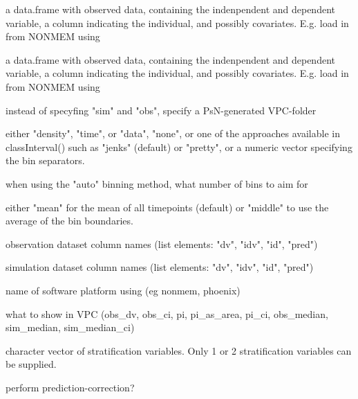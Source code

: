 \documentclass[letterpaper]{book}
\begin{document}
\begin{Arguments}
\begin{ldescription}
\item[\code{sim}] a data.frame with observed data, containing the indenpendent and dependent variable, a column indicating the individual, and possibly covariates. E.g. load in from NONMEM using 

\item[\code{obs}] a data.frame with observed data, containing the indenpendent and dependent variable, a column indicating the individual, and possibly covariates. E.g. load in from NONMEM using 

\item[\code{psn\_folder}] instead of specyfing "sim" and "obs", specify a PsN-generated VPC-folder

\item[\code{bins}] either "density", "time", or "data", "none", or one of the approaches available in classInterval() such as "jenks" (default) or "pretty", or a numeric vector specifying the bin separators.

\item[\code{n\_bins}] when using the "auto" binning method, what number of bins to aim for

\item[\code{bin\_mid}] either "mean" for the mean of all timepoints (default) or "middle" to use the average of the bin boundaries.

\item[\code{obs\_cols}] observation dataset column names (list elements: "dv", "idv", "id", "pred")

\item[\code{sim\_cols}] simulation dataset column names (list elements: "dv", "idv", "id", "pred")

\item[\code{software}] name of software platform using (eg nonmem, phoenix)

\item[\code{show}] what to show in VPC (obs\_dv, obs\_ci, pi, pi\_as\_area, pi\_ci, obs\_median, sim\_median, sim\_median\_ci)

\item[\code{stratify}] character vector of stratification variables. Only 1 or 2 stratification variables can be supplied.

\item[\code{pred\_corr}] perform prediction-correction?


\end{ldescription}
\end{Arguments}
\end{document}

